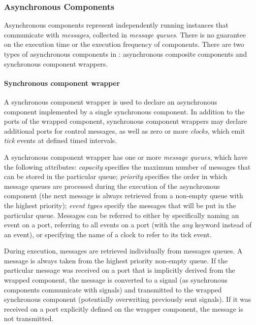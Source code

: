 
\subsubsection{Asynchronous Components}
Asynchronous components represent independently running instances that communicate with \emph{messages}, collected in \emph{message queues}. There is no guarantee on the execution time or the execution frequency of components. 
There are two types of asynchronous components in \gamma: asynchronous composite components and synchronous component wrappers.

\paragraph{Synchronous component wrapper} A synchronous component wrapper is used to declare an asynchronous component implemented by a single synchronous component. In addition to the ports of the wrapped component, synchronous component wrappers may declare additional ports for control messages, as well as zero or more \emph{clocks}, which emit \emph{tick} events at defined timed intervals.

A synchronous component wrapper has one or more
\emph{message queues}, which have the following attributes: \emph{capacity} specifies the maximum number of messages that can be stored in the particular	queue; \emph{priority} specifies the order in which message queues are processed during 	the execution of the asynchronous component (the next message is always retrieved from a non-empty queue with the highest priority); \emph{event types} specify the messages that will be put in the particular queue. Messages can be referred to either by specifically naming an event on a port, referring to all events on a port (with the \emph{any} keyword instead of an event), or specifying the name of a clock to refer to its tick event.

During execution, messages are retrieved individually from messages queues. A message
is always taken from the highest priority non-empty queue. If the particular message was
received on a port that is implicitly derived from the wrapped component, the message is
converted to a signal (as synchronous components communicate with signals) and transmitted
to the wrapped synchronous component (potentially overwriting previously sent signals). If
it was received on a port explicitly defined on the wrapper component, the message is not transmitted.

